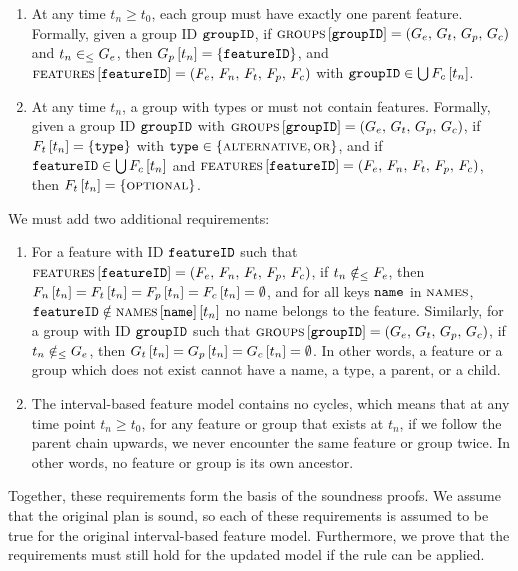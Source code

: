 \begin{enumerate}[\wf{\arabic*}, itemsep=0mm]
   \item At any time $t_n \geq t_0$, each group must have exactly one parent feature. Formally, given a group ID $\texttt{groupID}$, if $\textsc{groups}{} \left[ \texttt{groupID} \right] = \left(G_e,\, G_t,\, G_p,\, G_c\right)$ and $t_n \in_\leq G_e$, then $G_p \left[ t_n \right] = \left\{\texttt{featureID}\right\}$, and $\textsc{features} \left[ \texttt{featureID} \right] = \left(F_e,\, F_n,\, F_t,\, F_p,\, F_c\right)$ with $\texttt{groupID} \in \bigcup F_c \left[ t_n \right]$.
   \item At any time $t_n$, a group with types \xortype{} or \ortype{} must not contain \mandatory{} features. Formally, given a group ID $\texttt{groupID}$ with $\textsc{groups}{} \left[ \texttt{groupID} \right] = \left(G_e,\, G_t,\, G_p,\, G_c\right)$, if $F_t \left[ t_n \right] = \left\{\texttt{type}\right\}$ with $\texttt{type} \in \left\{\textsc{alternative}{}, \textsc{or}{}\right\}$, and if $\texttt{featureID} \in \bigcup F_c \left[ t_n \right]$ and $\textsc{features} \left[ \texttt{featureID} \right] = \left(F_e,\, F_n,\, F_t,\, F_p,\, F_c\right)$, then $F_t \left[ t_n \right] = \left\{\textsc{optional}\right\}$.
\end{enumerate}

We must add two additional requirements:
\begin{enumerate}[itemsep=0mm]
   \item[\wf{8}] For a feature with ID $\texttt{featureID}$ such that $\textsc{features} \left[ \texttt{featureID} \right] = \left(F_e,\, F_n,\, F_t,\, F_p,\, F_c\right)$, if $t_n \notin_\leq F_e$, then $F_n \left[ t_n \right] = F_t \left[ t_n \right] = F_p \left[ t_n \right] = F_c \left[ t_n \right] = \emptyset$, and for all keys $\texttt{name}$ in $\textsc{names}$, $\texttt{featureID} \notin \textsc{names} \left[ \texttt{name} \right] \left[ t_n \right]$ \textemdash{} no name belongs to the feature. Similarly, for a group with ID $\texttt{groupID}$ such that $\textsc{groups}{} \left[ \texttt{groupID} \right] = \left(G_e,\, G_t,\, G_p,\, G_c\right)$, if $t_n \notin_\leq G_e$, then $G_t \left[ t_n \right] = G_p \left[ t_n \right] = G_c \left[ t_n \right] = \emptyset$. In other words, a feature or a group which does not exist cannot have a name, a type, a parent, or a child.
   \item[\wf{9}] The interval-based feature model contains no cycles, which means that at any time point $t_n \geq t_0$, for any feature or group that exists at $t_n$, if we follow the parent chain upwards, we never encounter the same feature or group twice. In other words, no feature or group is its own ancestor.
\end{enumerate}

Together, these requirements form the basis of the soundness proofs. We assume that the original plan is sound, so each of these requirements is assumed to be true for the original interval-based feature model. Furthermore, we prove that the requirements must still hold for the updated model if the rule can be applied.

